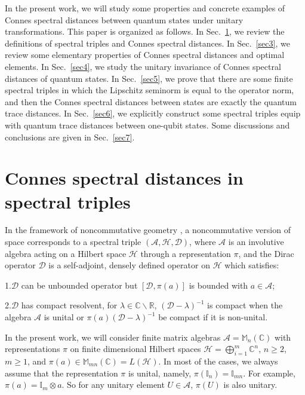 \documentclass[a4paper,12pt]{article}
\begin{document}
In the present work, we will study some properties and concrete examples of Connes spectral distances between quantum states under unitary transformations.
This paper is organized as follows. In Sec.~\ref{sec2}, we review the definitions of spectral triples and Connes spectral distances.
In Sec.~\ref{sec3}, we review some elementary properties of Connes spectral distances and optimal elements.
In Sec.~\ref{sec4}, we study the unitary invariance of Connes spectral distances
of quantum states. In Sec.~\ref{sec5}, we prove that there are some finite spectral triples in which the Lipschitz seminorm is equal to the operator norm, and then the Connes spectral distances between states are exactly the quantum trace distances.
In Sec.~\ref{sec6}, we explicitly construct some spectral triples equip with quantum trace distances between one-qubit states. 
Some discussions and conclusions are given in Sec.~\ref{sec7}.



\section{Connes spectral distances in spectral triples}\label{sec2}

In the framework of noncommutative geometry \cite{Connes}, a noncommutative version of space corresponds to a spectral triple $(\mathcal{A}, \mathcal{H},
\mathcal{D})$, where $\mathcal{A}$ is an involutive algebra acting on a
Hilbert space $\mathcal{H}$ through a representation $\pi$, and the Dirac
operator $\mathcal{D}$ is a self-adjoint, densely defined operator on
$\mathcal{H}$ which satisfies:

1.\;\;$\mathcal{D}$ can be unbounded operator but $[\mathcal{D},
\pi (a)]$ is bounded with $a \in \mathcal{A}$;

2.\;\;$\mathcal{D}$ has compact resolvent, for $\lambda \in
\mathbb{C} \backslash \mathbb{R}$, $(\mathcal{D}- \lambda)^{- 1}$ is compact
when the algebra $\mathcal{A}$ is unital or $\pi (a)  (\mathcal{D}-
\lambda)^{- 1}$ be compact if it is non-unital.

In the present work, we will consider finite matrix
algebras $\mathcal{A}=\mathbb{M}_n (\mathbb{C})$ with representations $\pi$ on
finite dimensional Hilbert spaces $\mathcal{H}= \bigoplus_{i = 1}^m
\mathbb{C}^n$, $n \geqslant 2$, $m \geqslant 1$, and $\pi (a) \in
\mathbb{M}_{mn} (\mathbb{C}) = L (\mathcal{H})$.
In most of the cases, we always assume that the
representation $\pi$ is unital, namely, $\pi (\mathbb{I}_{n}) =\mathbb{I}_{mn}$. For example, $\pi (a) =\mathbb{I}_m \otimes
a$. So for any unitary element $U \in \mathcal{A}$, $\pi (U)$ is also unitary.
\end{document}
